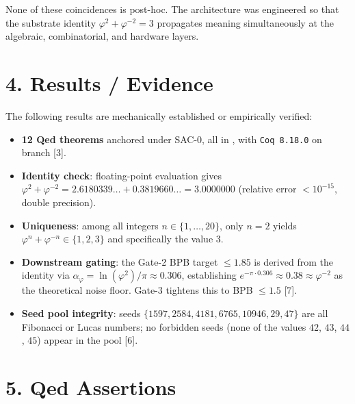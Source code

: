 None of these coincidences is post-hoc. The
architecture was engineered so that the substrate
identity \(\varphi^2 + \varphi^{-2} = 3\)
propagates meaning simultaneously at the
algebraic, combinatorial, and hardware layers.

\section{4. Results /
Evidence}\label{fa_03:results-evidence}

The following results are mechanically established
or empirically verified:

\begin{itemize}
\tightlist
\item
  \textbf{12 Qed theorems} anchored under SAC-0,
  all in
  ,
  with \texttt{Coq\ 8.18.0} on
   branch
   [3].
\item
  \textbf{Identity check}: floating-point
  evaluation gives
  \(\varphi^2 + \varphi^{-2} = 2.6180339\ldots + 0.3819660\ldots = 3.0000000\)
  (relative error \(< 10^{-15}\), double
  precision).
\item
  \textbf{Uniqueness}: among all integers
  \(n \in \{1, \ldots, 20\}\), only \(n = 2\)
  yields
  \(\varphi^n + \varphi^{-n} \in \{1, 2, 3\}\) and
  specifically the value \(3\).
\item
  \textbf{Downstream gating}: the Gate-2 BPB
  target \(\leq 1.85\) is derived from the
  identity via
  \(\alpha_\varphi = \ln(\varphi^2)/\pi \approx 0.306\),
  establishing
  \(e^{-\pi \cdot 0.306} \approx 0.38 \approx \varphi^{-2}\)
  as the theoretical noise floor. Gate-3 tightens
  this to BPB \(\leq 1.5\) [7].
\item
  \textbf{Seed pool integrity}: seeds
  \(\{1597, 2584, 4181, 6765, 10946, 29, 47\}\)
  are all Fibonacci or Lucas numbers; no forbidden
  seeds (none of the values \(42\), \(43\),
  \(44\), \(45\)) appear in the pool [6].
\end{itemize}

\section{5. Qed
Assertions}\label{fa_03:qed-assertions}


